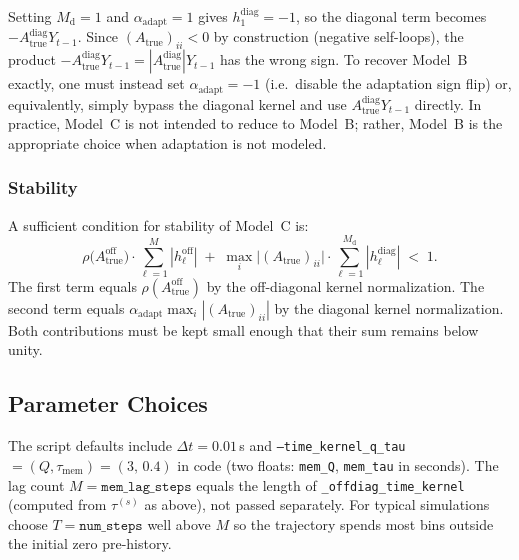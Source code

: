 \documentclass[11pt]{article}
\begin{document}
Setting $M_{\mathrm{d}}=1$ and $\alpha_{\mathrm{adapt}}=1$ gives
$h^{\mathrm{diag}}_1=-1$, so the diagonal term becomes 
$-A_{\text{true}}^{\mathrm{diag}}Y_{t-1}$.
Since $(A_{\text{true}})_{ii}<0$ by construction
(negative self-loops), the product
$-A_{\text{true}}^{\mathrm{diag}}Y_{t-1}
 =|A_{\text{true}}^{\mathrm{diag}}|Y_{t-1}$
has the wrong sign.
To recover Model~B exactly, one must instead set
$\alpha_{\mathrm{adapt}}=-1$ (i.e.\ disable the adaptation sign
flip) or, equivalently, simply bypass the diagonal kernel and use
$A_{\text{true}}^{\mathrm{diag}}Y_{t-1}$ directly.
In practice, Model~C is not intended to reduce to Model~B; rather,
Model~B is the appropriate choice when adaptation is not modeled.

\subsubsection{Stability}

A sufficient condition for stability of Model~C is:
\begin{equation}
  \rho\!\bigl(A_{\text{true}}^{\mathrm{off}}\bigr)
  \cdot\sum_{\ell=1}^{M}|h^{\mathrm{off}}_\ell| 
  \;+\;
  \max_i\bigl|(A_{\text{true}})_{ii}\bigr|
  \cdot\sum_{\ell=1}^{M_{\mathrm{d}}}
        |h^{\mathrm{diag}}_\ell| 
  \;<\; 1.
  \label{eq:stabilityC}
\end{equation}
The first term equals
$\rho(A_{\text{true}}^{\mathrm{off}})$ by the off-diagonal kernel
normalization.
The second term equals
$\alpha_{\mathrm{adapt}}\max_i|(A_{\text{true}})_{ii}|$ by the
diagonal kernel normalization.
Both contributions must be kept small enough that their sum remains
below unity.

\subsection{Parameter Choices}
\label{sec:params}

The script defaults include $\Delta t=0.01$\,s and
\texttt{--time\_kernel\_q\_tau} $=(Q,\tau_{\mathrm{mem}})=(3,\,0.4)$
in code (two floats: \texttt{mem\_Q}, \texttt{mem\_tau} in seconds).
The lag count $M=\texttt{mem\_lag\_steps}$ equals the length of
\texttt{\_offdiag\_time\_kernel} (computed from $\tau^{(s)}$ as above), not passed
separately.  For typical simulations choose $T=\texttt{num\_steps}$ well above
$M$ so the trajectory spends most bins outside the initial zero pre-history.
\end{document}
